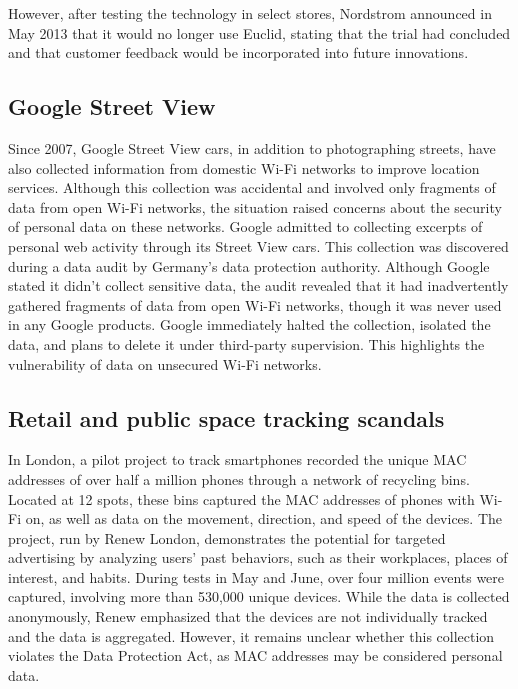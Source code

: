 \documentclass[aps,prb,twocolumn,superscriptaddress,floatfix,longbibliography,nofootinbib]{revtex4-2}
\begin{document}
  However, after testing the technology in select stores, Nordstrom announced in May 2013 
  that it would no longer use Euclid, stating that the trial had concluded and that 
  customer feedback would be incorporated into future innovations.\cite{Nordstrom2013}


  \subsection{\label{subsec:Google}Google Street View}
  Since 2007, Google Street View cars, in addition to photographing streets,
have also collected information from domestic Wi-Fi networks to improve location
services. Although this collection was accidental and involved only fragments of
data from open Wi-Fi networks, the situation raised concerns about the security
of personal data on these networks. Google admitted to collecting excerpts of personal
web activity through its Street View cars. This collection was discovered during
a data audit by Germany's data protection authority. Although Google stated it didn't
collect sensitive data, the audit revealed that it had inadvertently gathered fragments
of data from open Wi-Fi networks, though it was never used in any Google products.
Google immediately halted the collection, isolated the data, and plans to delete it
under third-party supervision. This highlights the vulnerability of data on unsecured
Wi-Fi networks.\cite{Google2007}

  \subsection{\label{subsec:London}Retail and public space tracking scandals}
  In London, a pilot project to track smartphones recorded the unique MAC addresses
of over half a million phones through a network of recycling bins. Located at 12 spots,
these bins captured the MAC addresses of phones with Wi-Fi on, as well as data on the
movement, direction, and speed of the devices. The project, run by Renew London, demonstrates
the potential for targeted advertising by analyzing users' past behaviors, such as their
workplaces, places of interest, and habits. During tests in May and June, over four million
events were captured, involving more than 530,000 unique devices. While the data is collected
anonymously, Renew emphasized that the devices are not individually tracked and the data
is aggregated. However, it remains unclear whether this collection violates the Data Protection
Act, as MAC addresses may be considered personal data.\cite{RenewLondon2013}
\end{document}
